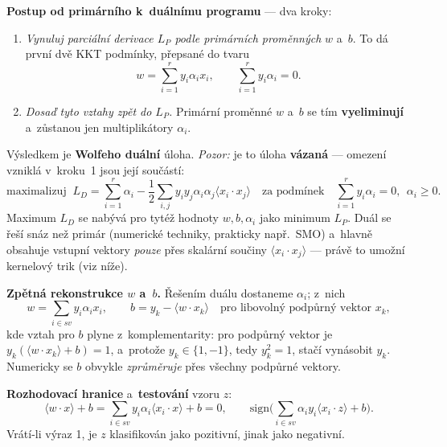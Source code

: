 \documentclass[11pt,a4paper]{article}
\theoremstyle{definition}
\begin{document}
\begin{defbox}
\textbf{Postup od primárního k~duálnímu programu} --- dva kroky:
\begin{enumerate}
\item \emph{Vynuluj parciální derivace $L_P$ podle primárních proměnných} $w$ a~$b$. To dá
      první dvě KKT podmínky, přepsané do tvaru
      \[ w=\sum_{i=1}^{r} y_i\alpha_i x_i, \qquad \sum_{i=1}^{r} y_i\alpha_i = 0. \]
\item \emph{Dosaď tyto vztahy zpět do $L_P$.} Primární proměnné $w$ a~$b$ se tím
      \textbf{vyeliminují} a~zůstanou jen multiplikátory $\alpha_i$.
\end{enumerate}
Výsledkem je \textbf{Wolfeho duální} úloha. \emph{Pozor:} je to úloha \textbf{vázaná} ---
omezení vzniklá v~kroku~1 jsou její součástí:
\[ \text{maximalizuj }\ L_D=\sum_{i=1}^{r}\alpha_i-\frac12\sum_{i,j}y_iy_j\alpha_i\alpha_j
   \langle x_i\cdot x_j\rangle
   \quad\text{za podmínek}\quad \sum_{i=1}^{r} y_i\alpha_i=0,\ \ \alpha_i\ge 0. \]
Maximum $L_D$ se nabývá pro tytéž hodnoty $w,b,\alpha_i$ jako minimum $L_P$. Duál se řeší
snáz než primár (numerické techniky, prakticky např.\ SMO) a~hlavně obsahuje vstupní vektory
\emph{pouze} přes skalární součiny $\langle x_i\cdot x_j\rangle$ --- právě to umožní
kernelový trik (viz níže).

\textbf{Zpětná rekonstrukce $w$ a~$b$.} Řešením duálu dostaneme $\alpha_i$; z~nich
\[ w=\sum_{i\in \mathit{sv}} y_i\alpha_i x_i, \qquad
   b = y_k - \langle w\cdot x_k\rangle \quad\text{pro libovolný podpůrný vektor } x_k, \]
kde vztah pro $b$ plyne z~komplementarity: pro podpůrný vektor je
$y_k(\langle w\cdot x_k\rangle+b)=1$, a~protože $y_k\in\{1,-1\}$, tedy $y_k^2=1$, stačí
vynásobit $y_k$. Numericky se $b$ obvykle \emph{zprůměruje} přes všechny podpůrné vektory.

\textbf{Rozhodovací hranice} a~\textbf{testování} vzoru $z$:
\[ \langle w\cdot x\rangle+b=\sum_{i\in \mathit{sv}}y_i\alpha_i\langle x_i\cdot x\rangle+b=0,
\qquad
\mathrm{sign}\Big(\sum_{i\in \mathit{sv}}\alpha_iy_i\langle x_i\cdot z\rangle+b\Big). \]
Vrátí-li výraz 1, je $z$ klasifikován jako pozitivní, jinak jako negativní.
\end{defbox}
\end{document}
